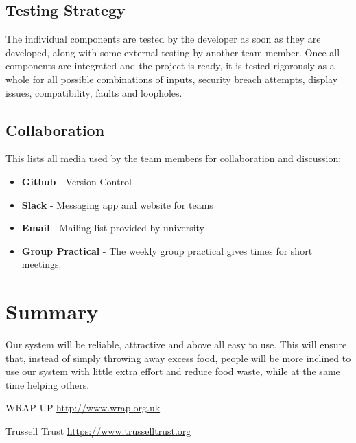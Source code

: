 \documentclass[12pt]{article}
\begin{document}
\subsection{Testing Strategy}

The individual components are tested by the developer as soon as they are developed, along with some external testing by another team member. Once all components are integrated and the project is ready, it is tested rigorously as a whole for all possible combinations of inputs, security breach attempts, display issues, compatibility, faults and loopholes.

\subsection{Collaboration}

This lists all media used by the team members for collaboration and discussion:

\begin{itemize}

\item \textbf{Github} - Version Control 


\item \textbf{Slack} - Messaging app and website for teams


\item \textbf{Email} - Mailing list provided by university


\item \textbf{Group Practical} - The weekly group practical gives times for short meetings.

\end{itemize}

\section{Summary}

Our system will be reliable, attractive and above all easy to use. This will ensure that, instead of simply throwing away excess food, people will be more inclined to use our system with little extra effort and reduce food waste, while at the same time helping others. 

\begin{thebibliography}{1}

   WRAP UP  \href{http://www.wrap.org.uk/sites/files/wrap/Household_food_waste_in_the_UK_2015_Report.pdf}{http://www.wrap.org.uk}

   Trussell Trust \href{https://www.trusselltrust.org/2015/11/18/uk-foodbank-use-still-at-record-levels-as-hunger-remains-major-concern-for-low-income-families/}{https://www.trusselltrust.org}
\end{thebibliography}
\end{document}
